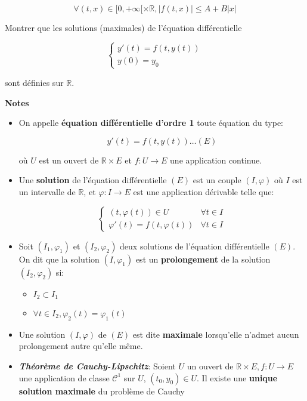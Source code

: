 \documentclass[10pt,a4paper,oneside]{article}
\newenvironment{exercice}[1][Exercice]{\begin{trivlist}
\item[\hskip \labelsep {\bfseries #1}]}{\end{trivlist}}
\begin{document}
\begin{exercice}{1}
\begin{enumerate}
\[ \forall(t,x) \in [0,+\infty[ \times \mathbb{R}, |f(t,x)| \leq A + B |x| \]

Montrer que les solutions (maximales) de l'équation différentielle

\[ \begin{cases}
y'(t) = f(t,y(t)) \\
y(0) = y_0
\end{cases} \]

sont définies sur $\mathbb{R}$.

\textbf{Notes}

\begin{itemize}
\item
On appelle \textbf{équation différentielle d'ordre 1} toute équation du type:

\[ y'(t) = f(t,y(t)) \ldots (E) \]

où $U$ est un ouvert de $\mathbb{R} \times E$ et $f : U \to E$ une application continue.

\item
Une \textbf{solution} de l'équation différentielle $(E)$ est un couple $(I,\varphi)$ où $I$ est un intervalle de $\mathbb{R}$, et $\varphi : I \to E$ est une application dérivable telle que:

\[ \begin{cases}
(t, \varphi(t)) \in U & \forall t \in I \\
\varphi'(t) = f(t,\varphi(t)) & \forall t \in I
\end{cases} \]

\item
Soit $(I_1,\varphi_1)$ et $(I_2,\varphi_2)$ deux solutions de l'équation différentielle $(E)$. On dit que la solution $(I,\varphi_1)$ est un \textbf{prolongement} de la solution $(I_2,\varphi_2)$ si:

\begin{itemize}
\item
$I_2 \subset I_1$
\item
$\forall t \in I_2, \varphi_2(t) = \varphi_1(t)$
\end{itemize}

\item
Une solution $(I,\varphi)$ de $(E)$ est dite \textbf{maximale} lorsqu'elle n'admet aucun prolongement autre qu'elle même.

\item
\textbf{\emph{Théorème de Cauchy-Lipschitz}}: Soient $U$ un ouvert de $\mathbb{R} \times E, f : U \to E$ une application de classe $\mathcal{C}^1$ sur $U$, $(t_0,y_0) \in U$. Il existe une \textbf{unique solution maximale} du problème de Cauchy


\end{itemize}
\end{enumerate}
\end{exercice}
\end{document}
